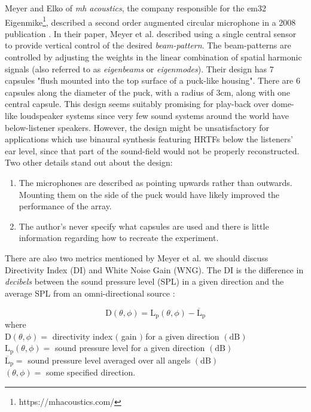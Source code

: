 Meyer and Elko of \textit{mh acoustics}, the company responsible for the em32 Eigenmike\footnote{https://mhacoustics.com/}, described a second order augmented circular microphone in a 2008 publication \cite{meyer2008spherical}. In their paper, Meyer et al. described using a single central sensor to provide vertical control of the desired \textit{beam-pattern}. The beam-patterns are controlled by adjusting the weights in the linear combination of spatial harmonic signals (also referred to as \textit{eigenbeams} or \textit{eigenmodes}). Their design has 7 capsules "flush mounted into the top surface of a puck-like housing". There are 6 capsules along the diameter of the puck, with a radius of 3cm, along with one central capsule. This design seems suitably promising for play-back over dome-like loudspeaker systems since very few sound systems around the world have below-listener speakers. However, the design might be unsatisfactory for applications which use binaural synthesis featuring HRTFs below the listeners' ear level, since that part of the sound-field would not be properly reconstructed. Two other details stand out about the design:

\begin{enumerate}
    \item The microphones are described as pointing upwards rather than outwards. Mounting them on the side of the puck would have likely improved the performance of the array. 
    \item The author's never specify what capsules are used and there is little information regarding how to recreate the experiment.
\end{enumerate}

There are also two metrics mentioned by Meyer et al. we should discuss Directivity Index (DI) and White Noise Gain (WNG). The DI is the difference in \textit{decibels} between the sound pressure level (SPL) in a given direction and the average SPL from an omni-directional source \cite{LONG201439}:

$$
\mathrm{D}(\theta, \phi)=\mathrm{L}_{\mathrm{p}}(\theta, \phi)-\overline{\mathrm{L}}_{\mathrm{p}}
$$
where \\
    $\mathrm{D}(\theta, \phi)=$ directivity index $($ gain $)$ for a given direction $(\mathrm{dB})$ \\
    $\mathrm{L}_{\mathrm{p}}(\theta, \phi)=$ sound pressure level for a given direction $(\mathrm{dB})$ \\
    $\overline{\mathrm{L}}_{\mathrm{p}}=$ sound pressure level averaged over all angels $(\mathrm{dB})$ \\
    $(\theta, \phi)=$ some specified direction.

